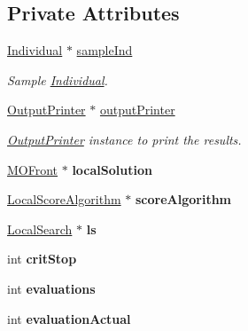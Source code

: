 \subsection*{Private Attributes}
\begin{DoxyCompactItemize}
\item 
\mbox{\hyperlink{classIndividual}{Individual}} $\ast$ \mbox{\hyperlink{classEA_aee2992080a3ffc95c9edea9cc142f62d}{sample\+Ind}}
\begin{DoxyCompactList}\small\item\em Sample \mbox{\hyperlink{classIndividual}{Individual}}. \end{DoxyCompactList}\item 
\mbox{\label{classEA_a003551d80fd0fd6e7bc29870ec1b2bd8}} 
\mbox{\hyperlink{classOutputPrinter}{Output\+Printer}} $\ast$ \mbox{\hyperlink{classEA_a003551d80fd0fd6e7bc29870ec1b2bd8}{output\+Printer}}
\begin{DoxyCompactList}\small\item\em \mbox{\hyperlink{classOutputPrinter}{Output\+Printer}} instance to print the results. \end{DoxyCompactList}\item 
\mbox{\label{classEA_a340f68daee20bce5089deed405edb791}} 
\mbox{\hyperlink{classMOFront}{M\+O\+Front}} $\ast$ {\bfseries local\+Solution}
\item 
\mbox{\label{classEA_ad4c30ccbc633bfa530fa50ca0970bd18}} 
\mbox{\hyperlink{classLocalScoreAlgorithm}{Local\+Score\+Algorithm}} $\ast$ {\bfseries score\+Algorithm}
\item 
\mbox{\label{classEA_aeba2a26cf290afd924fbafbd0c4ad64d}} 
\mbox{\hyperlink{classLocalSearch}{Local\+Search}} $\ast$ {\bfseries ls}
\item 
\mbox{\label{classEA_a3acbcb04351627ec86125084c251e12d}} 
int {\bfseries crit\+Stop}
\item 
\mbox{\label{classEA_ad7cefa1c91b348cf8436f49ae83560d6}} 
int {\bfseries evaluations}
\item 
\mbox{\label{classEA_ad612447f4ae22f8c1b651c7d18471846}} 
int {\bfseries evaluation\+Actual}
\item 
\mbox{\label{classEA_ac5a4cf8f9e12dfc07f8d4d4019e89540}} 

\end{DoxyCompactItemize}
